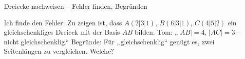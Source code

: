 \begin{aufgabe}{Dreiecke nachweisen – Fehler finden, Begründen}
\begin{teile}
\teil Ich finde den Fehler: Zu zeigen ist, dass $A(2 | 3 | 1)$, $B(6 | 3 | 1)$, $C(4 | 5 | 2)$ ein gleichschenkliges Dreieck mit der Basis $AB$ bilden. Tom: „$|AB| = 4$, $|AC| = 3$ – nicht gleichschenklig.“
\teil Begründe: Für „gleichschenklig“ genügt es, zwei Seitenlängen zu vergleichen. Welche?
\end{teile}
\end{aufgabe}
